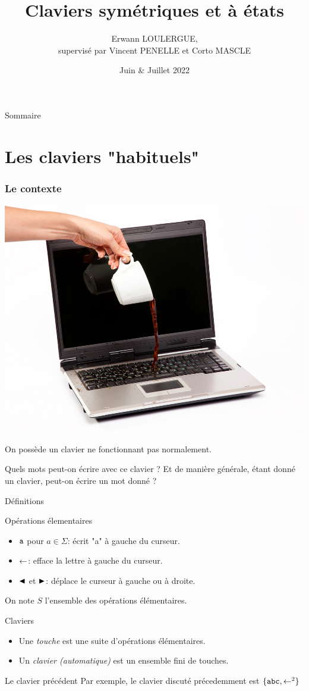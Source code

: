 \documentclass[11pt,french,professionalfonts]{beamer}
\title{Claviers symétriques et à états}
\author[Erwann LOULERGUE]{Erwann LOULERGUE, \texorpdfstring{\\supervisé par Vincent PENELLE et Corto MASCLE}{}}
\date{Juin \& Juillet 2022}
\institute[ENS Paris-Saclay]{Au LaBRI}
\begin{document}
\begin{frame}
	\titlepage
\end{frame}

\begin{frame}{Sommaire}
	\tableofcontents
\end{frame}

\section{Les claviers "habituels"}
\begin{frame}
	\frametitle{Le contexte}
	\begin{center}
		\includegraphics[height=0.3\textwidth]{Drame.jpg}	
	\end{center}

	On possède un clavier ne fonctionnant pas normalement. 

	Quels mots peut-on écrire avec ce clavier ? Et de manière générale, étant donné un clavier, peut-on écrire un mot donné ?

\end{frame}
\begin{frame}{Définitions}
	\begin{block}{Opérations élementaires}
		\begin{itemize}
			\item $\mathtt{a}$ pour $a \in \Sigma$: écrit "a" à gauche du curseur. \pause
			\item $\mathord{\leftarrow}$: efface la lettre à gauche du curseur. \pause
			\item $\mathord{\blacktriangleleft}$ et $\mathord{\blacktriangleright}$: déplace le curseur à gauche ou à droite.
		\end{itemize}
	\end{block}
	\vspace{-8pt}
	On note $S$ l'ensemble des opérations élémentaires.
	\pause
	\begin{block}{Claviers}
		\begin{itemize}
			\item Une \emph{touche} est une suite d'opérations élémentaires. \pause
			\item Un \emph{clavier (automatique)} est un ensemble fini de touches.
		\end{itemize}
	\end{block}
	\begin{exampleblock}{Le clavier précédent}
		Par exemple, le clavier discuté précedemment est $\{\mathtt{abc},\mathord{\leftarrow}^2\}$
	\end{exampleblock}
\end{frame}
\end{document}
